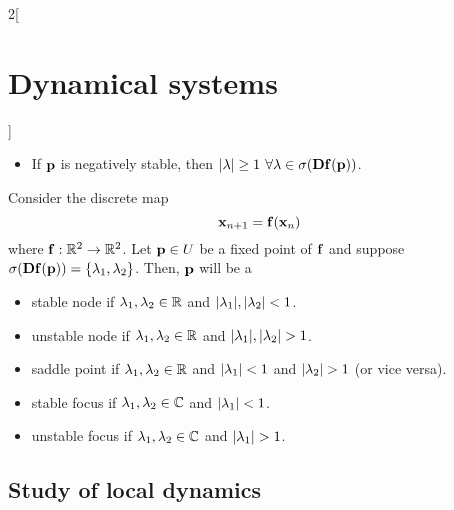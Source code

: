 \documentclass[../../../main_math.tex]{subfiles}
\begin{document}
\begin{multicols}{2}[\section{Dynamical systems}]
\begin{proposition}
\begin{itemize}
      \item If $\boldsymbol{\mathrm{p}}$ is negatively stable, then $\abs{\lambda}\geq 1$ $\forall\lambda\in\sigma(\boldsymbol{\mathrm{Df}}(\boldsymbol{\mathrm{p}}))$.
    \end{itemize}
  \end{proposition}
  \begin{theorem}
    Consider the discrete map $$\boldsymbol{\mathrm{x}}_{n+1}=\boldsymbol{\mathrm{f}}(\boldsymbol{\mathrm{x}}_n)$$ where $\boldsymbol{\mathrm{f}}:\mathbb{R}^2\rightarrow\mathbb{R}^2$. Let $\boldsymbol{\mathrm{p}}\in U$ be a fixed point of $\boldsymbol{\mathrm{f}}$ and suppose $\sigma(\boldsymbol{\mathrm{Df}}(\boldsymbol{\mathrm{p}}))=\{\lambda_1,\lambda_2\}$. Then, $\boldsymbol{\mathrm{p}}$ will be a
    \begin{itemize}
      \item {stable node} if $\lambda_1,\lambda_2\in\mathbb{R}$ and $\abs{\lambda_1},\abs{\lambda_2}<1$.
      \item {unstable node} if $\lambda_1,\lambda_2\in\mathbb{R}$ and $\abs{\lambda_1},\abs{\lambda_2}>1$.
      \item {saddle point} if $\lambda_1,\lambda_2\in\mathbb{R}$ and $\abs{\lambda_1}<1$ and $\abs{\lambda_2}>1$ (or vice versa).
      \item {stable focus} if $\lambda_1,\lambda_2\in\mathbb{C}$ and $\abs{\lambda_1}<1$.
      \item {unstable focus} if $\lambda_1,\lambda_2\in\mathbb{C}$ and $\abs{\lambda_1}>1$.
    \end{itemize}
  \end{theorem}
  \subsection{Study of local dynamics}

\end{multicols}
\end{document}

